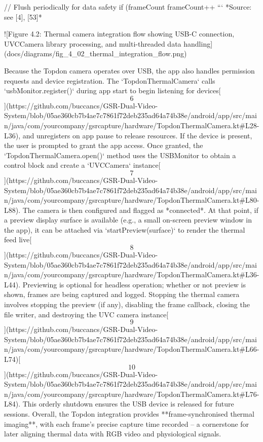 \documentclass[12pt,a4paper]{article}
\begin{document}
{{    // Flush periodically for data safety
    if (frameCount %
    frameCount++
}
```
*Source: see [4], [53]*

![Figure 4.2: Thermal camera integration flow showing USB-C connection, UVCCamera library processing, and multi-threaded data handling](docs/diagrams/fig_4_02_thermal_integration_flow.png)

Because the Topdon camera operates over USB, the app also handles
permission requests and device registration. The `TopdonThermalCamera`
calls `usbMonitor.register()` during app start to begin listening for
devices[\[6\]](https://github.com/buccancs/GSR-Dual-Video-System/blob/05ae360cb7b4ae7c7861f72deb235ad64a74b38e/android/app/src/main/java/com/yourcompany/gsrcapture/hardware/TopdonThermalCamera.kt#L28-L36),
and unregisters on app pause to release resources. If the device is
present, the user is prompted to grant the app access. Once granted, the
`TopdonThermalCamera.open()` method uses the USBMonitor to obtain a
control block and create a `UVCCamera`
instance[\[7\]](https://github.com/buccancs/GSR-Dual-Video-System/blob/05ae360cb7b4ae7c7861f72deb235ad64a74b38e/android/app/src/main/java/com/yourcompany/gsrcapture/hardware/TopdonThermalCamera.kt#L80-L88).
The camera is then configured and flagged as *connected*. At that point,
if a preview display surface is available (e.g., a small on-screen
preview window in the app), it can be attached via
`startPreview(surface)` to render the thermal feed
live[\[8\]](https://github.com/buccancs/GSR-Dual-Video-System/blob/05ae360cb7b4ae7c7861f72deb235ad64a74b38e/android/app/src/main/java/com/yourcompany/gsrcapture/hardware/TopdonThermalCamera.kt#L36-L44).
Previewing is optional for headless operation; whether or not preview is
shown, frames are being captured and logged. Stopping the thermal camera
involves stopping the preview (if any), disabling the frame callback,
closing the file writer, and destroying the UVC camera
instance[\[9\]](https://github.com/buccancs/GSR-Dual-Video-System/blob/05ae360cb7b4ae7c7861f72deb235ad64a74b38e/android/app/src/main/java/com/yourcompany/gsrcapture/hardware/TopdonThermalCamera.kt#L66-L74)[\[10\]](https://github.com/buccancs/GSR-Dual-Video-System/blob/05ae360cb7b4ae7c7861f72deb235ad64a74b38e/android/app/src/main/java/com/yourcompany/gsrcapture/hardware/TopdonThermalCamera.kt#L76-L84).
This orderly shutdown ensures the USB device is released for future
sessions. Overall, the Topdon integration provides **frame-synchronised
thermal imaging**, with each frame's precise capture time recorded -- a
cornerstone for later aligning thermal data with RGB video and
physiological signals.

}
\end{document}
